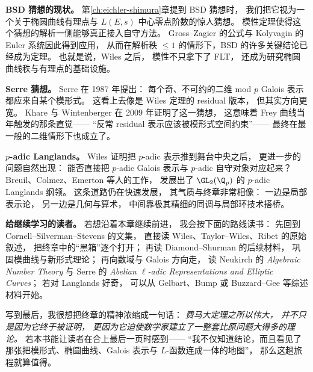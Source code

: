 \textbf{BSD 猜想的现状。}
第\ref{ch:eichler-shimura}章提到 BSD 猜想时，
我们把它视为一个关于椭圆曲线有理点与 $L(E,s)$ 中心零点阶数的惊人猜想。
模性定理使得这个猜想的解析一侧能够真正接入自守方法。
Gross--Zagier 的公式与 Kolyvagin 的 Euler 系统因此得到应用，
从而在解析秩 $\le 1$ 的情形下，BSD 的许多关键结论已经成为定理。
也就是说，Wiles 之后，
模性不只拿下了 FLT，
还成为研究椭圆曲线秩与有理点的基础设施。

\textbf{Serre 猜想。}
Serre 在 1987 年提出：
每个奇、不可约的二维 mod $p$ Galois 表示都应来自某个模形式。
这看上去像是 Wiles 定理的 residual 版本，
但其实方向更宽。
Khare 与 Wintenberger 在 2009 年证明了这一猜想，
这意味着 Frey 曲线当年触发的那条直觉——
“反常 residual 表示应该被模形式空间约束”——
最终在最一般的二维情形下也成立了。

\textbf{$p$-adic Langlands。}
Wiles 证明把 $p$-adic 表示推到舞台中央之后，
更进一步的问题自然出现：
能否直接把 $p$-adic Galois 表示与 $p$-adic 自守对象对应起来？
Breuil、Colmez、Emerton 等人的工作，
发展出了 $\GL_2(\Q_p)$ 的 $p$-adic Langlands 纲领。
这条道路仍在快速发展，
其气质与终章非常相像：
一边是局部表示论，
另一边是几何与算术，
中间靠极其精细的同调与局部环技术搭桥。

\textbf{给继续学习的读者。}
若想沿着本章继续前进，
我会按下面的路线读书：
先回到 Cornell--Silverman--Stevens 的文集，
直接读 Wiles、Taylor--Wiles、Ribet 的原始叙述，
把终章中的“黑箱”逐个打开；
再读 Diamond--Shurman 的后续材料，
巩固模曲线与新形式理论；
再向数域与 Galois 方向走，
读 Neukirch 的 \emph{Algebraic Number Theory} 与 Serre 的 \emph{Abelian $\ell$-adic Representations and Elliptic Curves}；
若对 Langlands 好奇，
可以从 Gelbart、Bump 或 Buzzard--Gee 等综述材料开始。

写到最后，我很想把终章的精神浓缩成一句话：
\emph{费马大定理之所以伟大，
并不只是因为它终于被证明，
更因为它迫使数学家建立了一整套比原问题大得多的理论。}
若本书能让读者在合上最后一页时感到——
“我不仅知道结论，而且看见了那张把模形式、椭圆曲线、Galois 表示与 $L$-函数连成一体的地图”，
那么这趟旅程就算值得。
